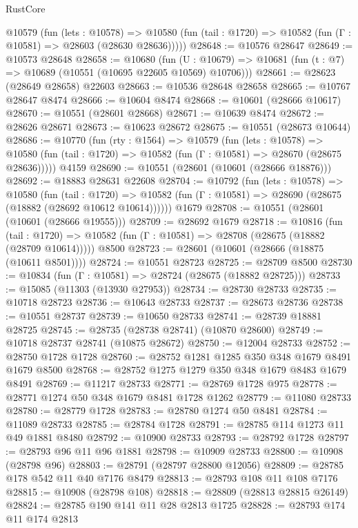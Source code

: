 \begin{lexlean}{RustCore}
\begin{coremodule}
    @10579
      (fun (lets : @10578) =>
      @10580 (fun (tail : @1720) => @10582 (fun (Γ : @10581) => @28603 (@28630 @28636)))))
@28648 := @10576 @28647
@28649 := @10573 @28648
@28658 := @10680
    (fun (U : @10679) => @10681 (fun (t : @7) => @10689 (@10551 (@10695 @22605 @10569) @10706)))
@28661 := @28623 (@28649 @28658) @22603
@28663 := @10536 @28648 @28658
@28665 := @10767 @28647 @8474
@28666 := @10604 @8474
@28668 := @10601 (@28666 @10617)
@28670 := @10551 (@28601 @28668)
@28671 := @10639 @8474
@28672 := @28626 @28671
@28673 := @10623 @28672
@28675 := @10551 (@28673 @10644)
@28686 := @10770
    (fun (rty : @1564) =>
    @10579
      (fun (lets : @10578) =>
      @10580 (fun (tail : @1720) => @10582 (fun (Γ : @10581) => @28670 (@28675 @28636)))))
    @4159
@28690 := @10551 (@28601 (@10601 (@28666 @18876)))
@28692 := @18883 @28631 @22608
@28704 := @10792
    (fun (lets : @10578) =>
    @10580
      (fun (tail : @1720) =>
      @10582 (fun (Γ : @10581) => @28690 (@28675 (@18882 (@28692 @10612 @10614))))))
    @1679
@28708 := @10551 (@28601 (@10601 (@28666 @19555)))
@28709 := @28692 @1679
@28718 := @10816
    (fun (tail : @1720) => @10582 (fun (Γ : @10581) => @28708 (@28675 (@18882 (@28709 @10614)))))
    @8500
@28723 := @28601 (@10601 (@28666 (@18875 (@10611 @8501))))
@28724 := @10551 @28723
@28725 := @28709 @8500
@28730 := @10834 (fun (Γ : @10581) => @28724 (@28675 (@18882 @28725)))
@28733 := @15085 (@11303 (@13930 @27953))
@28734 := @28730 @28733
@28735 := @10718 @28723
@28736 := @10643 @28733
@28737 := @28673 @28736
@28738 := @10551 @28737
@28739 := @10650 @28733
@28741 := @28739 @18881 @28725
@28745 := @28735 (@28738 @28741) (@10870 @28600)
@28749 := @10718 @28737 @28741 (@10875 @28672)
@28750 := @12004 @28733
@28752 := @28750 @1728 @1728
@28760 := @28752 @1281 @1285 @350 @348 @1679 @8491 @1679 @8500
@28768 := @28752 @1275 @1279 @350 @348 @1679 @8483 @1679 @8491
@28769 := @11217 @28733
@28771 := @28769 @1728 @975
@28778 := @28771 @1274 @50 @348 @1679 @8481 @1728 @1262
@28779 := @11080 @28733
@28780 := @28779 @1728
@28783 := @28780 @1274 @50 @8481
@28784 := @11089 @28733
@28785 := @28784 @1728
@28791 := @28785 @114 @1273 @11 @49 @1881 @8480
@28792 := @10900 @28733
@28793 := @28792 @1728
@28797 := @28793 @96 @11 @96 @1881
@28798 := @10909 @28733
@28800 := @10908 (@28798 @96)
@28803 := @28791 (@28797 @28800 @12056)
@28809 := @28785 @178 @542 @11 @40 @7176 @8479
@28813 := @28793 @108 @11 @108 @7176
@28815 := @10908 (@28798 @108)
@28818 := @28809 (@28813 @28815 @26149)
@28824 := @28785 @190 @141 @11 @28 @2813 @1725
@28828 := @28793 @174 @11 @174 @2813

\end{coremodule}
\end{lexlean}

